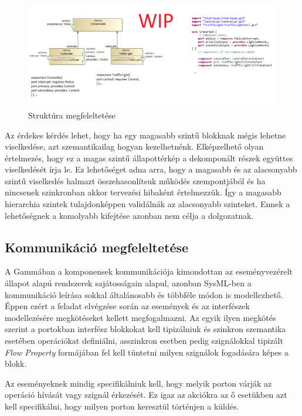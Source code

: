 \begin{figure}[!ht]
	\centering
	\includegraphics[width=140mm, keepaspectratio]{figures/contribution/md2g.png}
	\caption{Struktúra megfeleltetése}
	\label{fig:md2g}
\end{figure}

Az érdekes kérdés lehet, hogy ha egy magasabb szintű blokknak mégis lehetne viselkedése, azt szemantikailag hogyan kezelhetnénk. Elképzelhető olyan értelmezés, hogy ez a magas szintű állapottérkép a dekomponált részek együttes viselkedését írja le. Ez lehetőséget adna arra, hogy a magasabb és az alacsonyabb szintű viselkedés halmazt összehasonlítsuk működés szempontjából és ha nincsenek szinkronban akkor tervezési hibaként értelmezzük. Így a magasabb hierarchia szintek tulajdonképpen validálnák az alacsonyabb szinteket. Ennek a lehetőségnek a komolyabb kifejtése azonban nem célja a dolgozatnak.

\subsection{Kommunikáció megfeleltetése}

A Gammában a komponensek kommunikációja kimondottan az eseményvezérelt állapot alapú rendszerek sajátosságain alapul, azonban SysML-ben a kommunikáció leírása sokkal általánosabb és többféle módon is modellezhető. Éppen ezért a feladat elvégzése során az események és az interfészek modellezésére megkötéseket kellett megfogalmazni.
Az egyik ilyen megkötés szerint a portokban interfész blokkokat kell tipizálniuk és szinkron szemantika esetében operációkat definiálni, asszinkron esetben pedig szignálokkal tipizált \emph{Flow Property} formájában fel kell tüntetni milyen szignálok fogadására képes a blokk.

Az eseményeknek mindig specifikálniuk kell, hogy melyik porton várják az operáció hívását vagy szignál érkezését. Ez igaz az akciókra az ő esetükben azt kell specifikálni, hogy milyen porton keresztül történjen a küldés.

